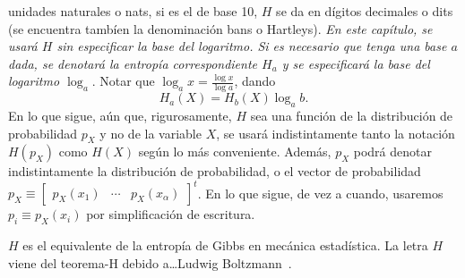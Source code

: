 unidades naturales o nats, si es el de base 10, $H$ se da en d\'igitos decimales
o dits (se encuentra tamb\'ien la denominaci\'on bans o Hartleys).  {\it En este
  cap\'itulo,  se usar\'a  $H$ sin  especificar la  base del  logaritmo.   Si es
  necesario  que  tenga   una  base  $a$  dada,  se   denotar\'a  la  entrop\'ia
  correspondiente  $H_a$ y se  especificar\'a la  base del  logaritmo $\log_a$}.
Notar que $\log_a x = \frac{\log x}{\log a}$, dando
%
\[
H_a(X)  =  H_b(X)  \log_a b.
\]
%
En  lo  que  sigue, a\'un  que,  rigurosamente,  $H$  sea  una funci\'on  de  la
distribuci\'on  de  probabilidad $p_X$  y  no de  la  variable  $X$, se  usar\'a
indistintamente  tanto  la notaci\'on  $H(p_X)$  como  $H(X)$  seg\'un lo  m\'as
conveniente.  Adem\'as, $p_X$  podr\'a denotar indistintamente la distribuci\'on
de  probabilidad,  o  el  vector  de probabilidad  $p_X  \equiv  \begin{bmatrix}
  p_X(x_1) & \cdots & p_X(x_\alpha) \end{bmatrix}^t$.  En lo que sigue, de vez a
cuando, usaremos $p_i \equiv p_X(x_i)$ por simplificaci\'on de escritura.

$H$ es el equivalente de la entrop\'ia de Gibbs en mec\'anica estad\'istica.  La
letra  $H$  viene del  teorema-H  debido  a\ldots Ludwig  Boltzmann~\cite{Jay65,
  Mer10, Mer18}.

